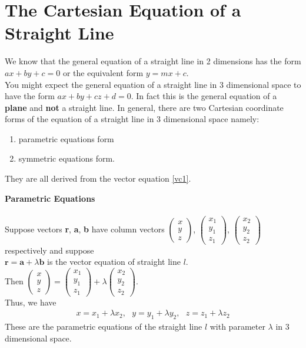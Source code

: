 \documentclass[titlepage,a4paper,12pt]{report}
\begin{document}
\section{The Cartesian Equation of a Straight Line}
We know that the general equation of a straight line in 2 dimensions has the form $ax+by+c=0$ or the equivalent form $y=mx+c$.\\
You might expect the general equation of a straight line in 3 dimensional space to have the form $ax+by+cz+d=0$. In fact this is the general equation of a \textbf{plane} and \textbf{not} a straight line. In general, there are two Cartesian coordinate forms of the equation of a straight line in 3 dimensional space namely:
\begin{enumerate}
\item parametric equations form
\item symmetric equations form.
\end{enumerate}They are all derived from the vector equation \eqref{vc1}.

\noindent\textbf{Parametric Equations}\\~\\
Suppose vectors \textbf{r}, \textbf{a}, \textbf{b} have column vectors $\begin{pmatrix}
x\\
y\\
z
\end{pmatrix}$, $\begin{pmatrix}
x_1\\
y_1\\
z_1
\end{pmatrix}$, $\begin{pmatrix}
x_2\\
y_2\\
z_2
\end{pmatrix}$ respectively and suppose \\
$\textbf{r}=\textbf{a}+\lambda\textbf{b}$ is the vector equation of straight line $l$.\\
Then $\begin{pmatrix}
x\\
y\\
z
\end{pmatrix}=\begin{pmatrix}
x_1\\
y_1\\
z_1
\end{pmatrix}+\lambda\begin{pmatrix}
x_2\\
y_2\\
z_2
\end{pmatrix}$. \\
Thus, we have \begin{eqnarray}\label{par} x=x_1+\lambda x_2,~~~y=y_1+\lambda y_2,~~~z=z_1+\lambda z_2\end{eqnarray}
These are the parametric equations of the straight line $l$ with parameter $\lambda$ in 3 dimensional space.
\end{document}
